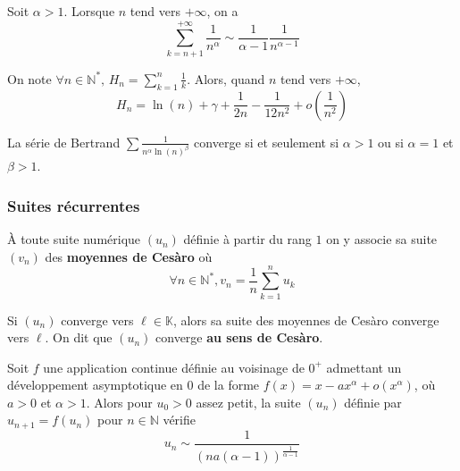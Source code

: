 
  \begin{lemma}
    Soit $\alpha > 1$. Lorsque $n$ tend vers $+\infty$, on a
    \[ \sum_{k=n+1}^{+\infty} \frac{1}{n^\alpha} \sim \frac{1}{\alpha - 1} \frac{1}{n^{\alpha - 1}} \]
  \end{lemma}


  \begin{proposition}
    On note $\forall n \in \mathbb{N}^*, \, H_n = \sum_{k=1}^{n} \frac{1}{k}$. Alors, quand $n$ tend vers $+\infty$,
    \[ H_n = \ln(n) + \gamma + \frac{1}{2n} - \frac{1}{12n^2} + o\left( \frac{1}{n^2} \right) \]
  \end{proposition}


  \begin{application}
    La série de Bertrand $\sum \frac{1}{n^\alpha \ln(n)^\beta}$ converge si et seulement si $\alpha > 1$ ou si $\alpha = 1$ et $\beta > 1$.
  \end{application}

  \subsubsection{Suites récurrentes}


  \begin{definition}
    À toute suite numérique $(u_n)$ définie à partir du rang $1$ on y associe sa suite $(v_n)$ des \textbf{moyennes de Cesàro} où
    \[ \forall n \in \mathbb{N}^*, v_n = \frac{1}{n} \sum_{k=1}^{n} u_k \]
  \end{definition}

  \begin{theorem}
    Si $(u_n)$ converge vers $\ell \in \mathbb{K}$, alors sa suite des moyennes de Cesàro converge vers $\ell$. On dit que $(u_n)$ converge \textbf{au sens de Cesàro}.
  \end{theorem}


  \begin{proposition}
    Soit $f$ une application continue définie au voisinage de $0^+$ admettant
    un développement asymptotique en $0$ de la forme $f(x) = x - ax^\alpha + o(x^\alpha)$, où $a > 0$ et $\alpha > 1$. Alors pour $u_0 > 0$ assez petit, la suite $(u_n)$ définie par $u_{n+1} = f(u_n)$ pour $n \in \mathbb{N}$ vérifie
    \[ u_n \sim \frac{1}{(na(\alpha-1))^{\frac{1}{\alpha-1}}} \]
  \end{proposition}

